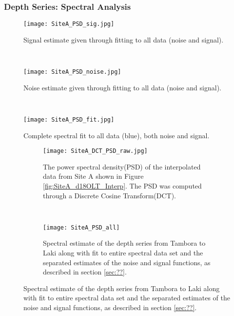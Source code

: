 \documentclass[../../CompleteThesis/Complete_1stDraft.tex]{subfiles}
\begin{document}
\subsubsection[Spectral Analysis]{Depth Series: Spectral Analysis}
\begin{marginfigure}
	\centering
	\begin{subfigure}{\marginparwidth}
		\centering
		\texttt{[image: SiteA\_PSD\_sig.jpg]}
		\caption{\footnotesize{Signal estimate given through fitting to all data (noise and signal).}}
		\label{fig:SiteA_PSD_sig}
	\end{subfigure}\\[1ex]
	
	\begin{subfigure}{\marginparwidth}
		\centering
		\texttt{[image: SiteA\_PSD\_noise.jpg]}
		\caption{\footnotesize{Noise estimate given through fitting to all data (noise and signal).}}
		\label{fig:SiteA_PSD_noise}
	\end{subfigure}\\[1ex]
	
	\begin{subfigure}{\marginparwidth}
		\centering
		\texttt{[image: SiteA\_PSD\_fit.jpg]}
		\caption{\footnotesize{Complete spectral fit to all data (blue), both noise and signal.}}
		\label{fig:SiteA_PSD_fit}
	\end{subfigure}
	\caption[Isolated spectral fits, Site A]{Spectral fits.}
	\label{fig:SpectralFitsIsolated}
\end{marginfigure}




\begin{figure}[h]
	\centering
	\begin{subfigure}{.45\textwidth}
		\centering
		\texttt{[image: SiteA\_DCT\_PSD\_raw.jpg]}
		\caption[PSD of LT data, Site A]{The power spectral density(PSD) of the interpolated data from Site A shown in Figure \ref{fig:SiteA_d18OLT_Interp}. The PSD was computed through a Discrete Cosine Transform(DCT).}
		\label{fig:SiteA_DCT_PSD_raw}
	\end{subfigure}
	~
	\begin{subfigure}{0.45\textwidth}
		\texttt{[image: SiteA\_PSD\_all]}
		\caption[Spectral fit, Site A]{Spectral estimate of the depth series from Tambora to Laki along with fit to entire spectral data set and the separated estimates of the noise and signal functions, as described in section \ref{sec:??}. }%
		\label{fig:SpectralFitsAll}
	\end{subfigure}
\end{figure}
\end{document}
